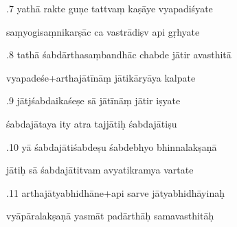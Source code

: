 \documentclass[article,12pt,a4paper]{memoir}%
\newcounter{parCount}
\begin{document}
	  
	  \pstart {}.7 yathā rakte guṇe tattvaṃ kaṣāye vyapadiśyate 
	{}
	\pend%
      

	  
	  \pstart \leavevmode%
	saṃyogisaṃnikarṣāc ca vastrādiṣv api gṛhyate 
	{}
	\pend%
      

	  
	  \pstart {}.8 tathā śabdārthasaṃbandhāc chabde jātir avasthitā 
	{}
	\pend%
      

	  
	  \pstart \leavevmode%
	vyapadeśe+arthajātīnāṃ jātikāryāya kalpate 
	{}
	\pend%
      

	  
	  \pstart {}.9 jātjśabdaikaśeṣe sā jātīnāṃ jātir iṣyate 
	{}
	\pend%
      

	  
	  \pstart \leavevmode%
	śabdajātaya ity atra tajjātiḥ śabdajātiṣu 
	{}
	\pend%
      

	  
	  \pstart {}.10 yā śabdajātiśabdeṣu śabdebhyo bhinnalakṣaṇā 
	{}
	\pend%
      

	  
	  \pstart \leavevmode%
	jātiḥ sā śabdajātitvam avyatikramya vartate 
	{}
	\pend%
      

	  
	  \pstart {}.11 arthajātyabhidhāne+api sarve jātyabhidhāyinaḥ 
	{}
	\pend%
      

	  
	  \pstart \leavevmode%
	vyāpāralakṣaṇā yasmāt padārthāḥ samavasthitāḥ 
	{}
	\pend%
      
\end{document}
